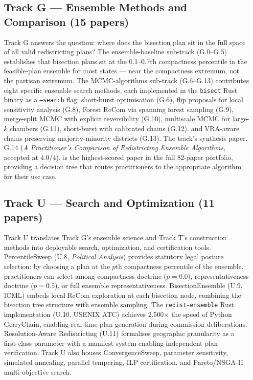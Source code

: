 \documentclass[11pt]{article}
\begin{document}
\subsection*{Track G --- Ensemble Methods and Comparison (15 papers)}

Track G answers the question: where does the bisection plan sit in the full space of all valid redistricting plans? The ensemble-baseline sub-track (G.0--G.5) establishes that bisection plans sit at the 0.1--0.7th compactness percentile in the feasible-plan ensemble for most states --- near the compactness extremum, not the partisan extremum. The MCMC-algorithms sub-track (G.6--G.13) contributes eight specific ensemble search methods, each implemented in the \texttt{bisect} Rust binary as a \texttt{--search} flag: short-burst optimisation (G.6), flip proposals for local sensitivity analysis (G.8), Forest ReCom via spanning forest sampling (G.9), merge-split MCMC with explicit reversibility (G.10), multiscale MCMC for large-$k$ chambers (G.11), short-burst with calibrated chains (G.12), and VRA-aware chains preserving majority-minority districts (G.13). The track's synthesis paper, G.14 (\emph{A Practitioner's Comparison of Redistricting Ensemble Algorithms}, accepted at 4.0/4), is the highest-scored paper in the full 82-paper portfolio, providing a decision tree that routes practitioners to the appropriate algorithm for their use case.

\subsection*{Track U --- Search and Optimization (11 papers)}

Track U translates Track G's ensemble science and Track T's construction methods into deployable search, optimization, and certification tools. PercentileSweep (U.8, \emph{Political Analysis}) provides statutory legal posture selection: by choosing a plan at the $p$th compactness percentile of the ensemble, practitioners can select among compactness doctrine ($p=0.0$), representativeness doctrine ($p=0.5$), or full ensemble representativeness. BisectionEnsemble (U.9, ICML) embeds local ReCom exploration at each bisection node, combining the bisection tree structure with ensemble sampling. The \texttt{redist-ensemble} Rust implementation (U.10, USENIX ATC) achieves 2,500$\times$ the speed of Python GerryChain, enabling real-time plan generation during commission deliberations. Resolution-Aware Redistricting (U.11) formalises geographic granularity as a first-class parameter with a manifest system enabling independent plan verification. Track U also houses ConvergenceSweep, parameter sensitivity, simulated annealing, parallel tempering, ILP certification, and Pareto/NSGA-II multi-objective search.
\end{document}
